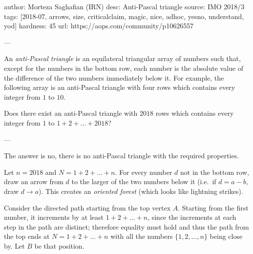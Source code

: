 author: Morteza Saghafian (IRN)
desc: Anti-Pascal triangle
source: IMO 2018/3
tags: [2018-07, arrows, size, criticalclaim, magic, nice, adhoc, yesno, understand, yod]
hardness: 45
url: https://aops.com/community/p10626557

---

An \emph{anti-Pascal triangle} is an equilateral triangular array
of numbers such that, except for the numbers in the bottom row,
each number is the absolute value of the difference
of the two numbers immediately below it.
For example, the following array is an anti-Pascal triangle
with four rows which contains every integer from $1$ to $10$.
\begin{center}
\end{center}
Does there exist an anti-Pascal triangle with $2018$ rows
which contains every integer from $1$ to $1+2+\dots +2018$?

---

The answer is no, there is no anti-Pascal triangle
with the required properties.

Let $n = 2018$ and $N = 1+2+\dots+n$.
For every number $d$ not in the bottom row,
draw an arrow from $d$ to the larger of the two numbers below it
(i.e.\ if $d=a-b$, draw $d \to a$).
This creates an \emph{oriented forest} (which looks like lightning strikes).

Consider the directed path starting from the top vertex $A$.
Starting from the first number, it increments by at least $1+2+\dots+n$,
since the increments at each step in the path are distinct;
therefore equality must hold
and thus the path from the top ends at $N = 1+2+\dots+n$
with all the numbers $\{1,2,\dots,n\}$ being close by.
Let $B$ be that position.

